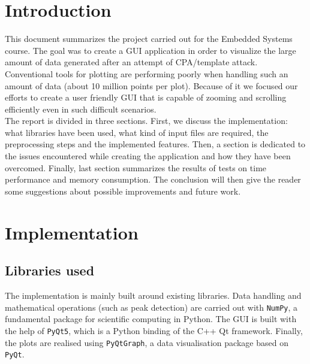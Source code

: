 \documentclass[11pt,a4paper]{article}
\begin{document}




\section{Introduction}
\label{sec:introduction}

This document summarizes the project carried out for the Embedded Systems course.
The goal was to create a GUI application in order to visualize the large amount of data generated after an attempt of CPA/template attack.
Conventional tools for plotting are performing poorly when handling such an amount of data (about 10 million points per plot).
Because of it we focused our efforts to create a user friendly GUI that is capable of zooming and scrolling efficiently even in such difficult scenarios.\\

The report is divided in three sections. First, we discuss the implementation: what libraries have been used, what kind of input files are required, the preprocessing steps and the implemented features.
Then, a section is dedicated to the issues encountered while creating the application and how they have been overcomed.
Finally, last section summarizes the results of tests on time performance and memory consumption.
The conclusion will then give the reader some suggestions about possible improvements and future work.



\section{Implementation}
\label{sec:implementation}

\subsection{Libraries used}
The implementation is mainly built around existing libraries.
Data handling and mathematical operations (such as peak detection) are carried out with \texttt{NumPy}, a fundamental package for scientific computing in Python.
The GUI is built with the help of \texttt{PyQt5}, which is a Python binding of the C++ Qt framework.
Finally, the plots are realised using \texttt{PyQtGraph}, a data visualisation package based on \texttt{PyQt}. 
\end{document}
